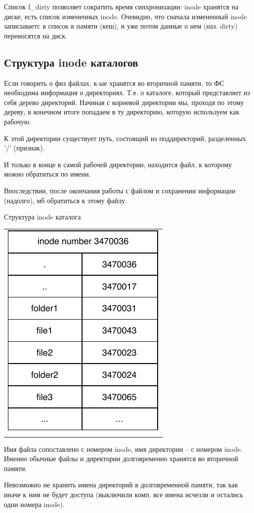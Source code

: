 Список f\_dirty позволяет сократить время синхронизации: inode хранятся на диске, есть список измененных inode. Очевидно, что сначала измененный inode записываетс в список в памяти (кеш), и уже потом данные о нем (наз. dirty) переносятся на диск.

\subsection{Структура inode каталогов}

Если говорить о физ файлах, к-ые хранятся во вторичной памяти, то ФС необходима информация о директориях. Т.е. о каталоге, который представляет из себя дерево директорий. Начиная с корневой директории мы, проходя по этому дереву, в конечном итоге попадаем в ту директорию, которую используем как рабочую.

К этой директории существует путь, состоящий из поддиректорий, разделенных '/' (признак).

И только в конце в самой рабочей директории, находится файл, к которому можно обратиться по имени.

Впоследствии, после окончания работы с файлом и сохранении информации (надолго), мб обратиться к этому файлу.

Структура inode каталога
\begin{table}[H]
  \centering
  \begin{tabular}{p{1\linewidth}}
    \centering
    \includegraphics[width=0.3\linewidth]{./images/inode_catalog.pdf}
  \end{tabular}
\end{table}

Имя файла сопоставлено с номером inode, имя директории -- с номером inode. Именно обычные файлы и директории долговременно хранятся во вторичной памяти.

Невозможно не хранить имена директорий в долговременной памяти, так как иначе к ним не будет доступа (выключили комп, все имена исчезли и остались одни номера inode).

